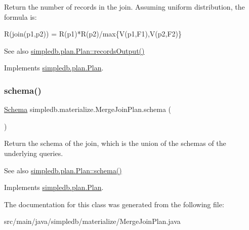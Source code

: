 Return the number of records in the join. Assuming uniform distribution, the formula is\+: 
\begin{DoxyPre} R(join(p1,p2)) = R(p1)*R(p2)/max\{V(p1,F1),V(p2,F2)\}\end{DoxyPre}
 \begin{DoxySeeAlso}{See also}
\hyperlink{interfacesimpledb_1_1plan_1_1Plan_a187e06657d356c80a7f743d7ff8fd257}{simpledb.\+plan.\+Plan\+::records\+Output()} 
\end{DoxySeeAlso}


Implements \hyperlink{interfacesimpledb_1_1plan_1_1Plan_a187e06657d356c80a7f743d7ff8fd257}{simpledb.\+plan.\+Plan}.

\mbox{\label{classsimpledb_1_1materialize_1_1MergeJoinPlan_a3e1d4a728b4454d33adc811aa24989f4}} 
\subsubsection{\texorpdfstring{schema()}{schema()}}
{\footnotesize\ttfamily \hyperlink{classsimpledb_1_1record_1_1Schema}{Schema} simpledb.\+materialize.\+Merge\+Join\+Plan.\+schema (\begin{DoxyParamCaption}{ }\end{DoxyParamCaption})\hspace{0.3cm}{\ttfamily [inline]}}

Return the schema of the join, which is the union of the schemas of the underlying queries. \begin{DoxySeeAlso}{See also}
\hyperlink{interfacesimpledb_1_1plan_1_1Plan_ad0ee1aa2c4e7147e9f8fc6f3301fa986}{simpledb.\+plan.\+Plan\+::schema()} 
\end{DoxySeeAlso}


Implements \hyperlink{interfacesimpledb_1_1plan_1_1Plan_ad0ee1aa2c4e7147e9f8fc6f3301fa986}{simpledb.\+plan.\+Plan}.



The documentation for this class was generated from the following file\+:\begin{DoxyCompactItemize}
\item 
src/main/java/simpledb/materialize/Merge\+Join\+Plan.\+java\end{DoxyCompactItemize}
